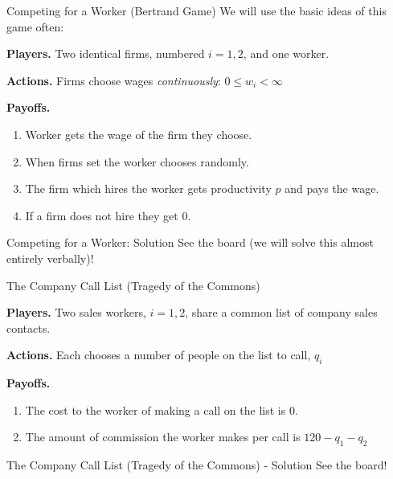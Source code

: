 \documentclass[aspectratio=169,usenames,dvipsnames]{beamer}
\newenvironment{wideitemize}{\itemize\addtolength{\itemsep}{10pt}}{\enditemize}
\begin{document}
\begin{frame}{Competing for a Worker (Bertrand Game)}
We will use the basic ideas of this game often:
\begin{wideitemize}
    \item \textbf{Players.} Two identical firms, numbered $i=1,2$, and one worker.
    \item \textbf{Actions.} Firms choose wages \textit{continuously}: $0\leq w_i < \infty$
    \item \textbf{Payoffs.} 
    \begin{enumerate}
        \item Worker gets the wage of the firm they choose.
        \item When firms set the worker chooses randomly.
        \item The firm which hires the worker gets productivity $p$ and pays the wage.
        \item If a firm does not hire they get 0.
    \end{enumerate}
\end{wideitemize}
\end{frame}

\begin{frame}{Competing for a Worker: Solution}
\centering
    \huge See the board (we will solve this almost entirely verbally)!
\end{frame}

\begin{frame}{The Company Call List (Tragedy of the Commons)}
\begin{wideitemize}
    \item \textbf{Players.} Two sales workers, $i=1,2$, share a common list of company sales contacts.
    \item \textbf{Actions.} Each chooses a number of people on the list to call, $q_i$
    \item \textbf{Payoffs.} 
    \begin{enumerate}
        \item The cost to the worker of making a call on the list is 0.
        \item The amount of commission the worker makes per call is $120-q_1-q_2$
    \end{enumerate}
\end{wideitemize}


\end{frame}

\begin{frame}{The Company Call List (Tragedy of the Commons) - Solution}
\centering
    \huge See the board!
\end{frame}
\end{document}
